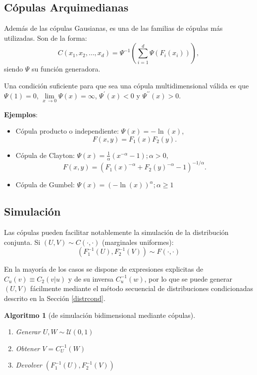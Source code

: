 \documentclass[
]{book}
\theoremstyle{break}
\newtheorem{conjecture}{Algoritmo}[chapter]
\theoremstyle{nonumberplain}
\begin{document}
\hypertarget{cuxf3pulas-arquimedianas}{%
\subsection{Cópulas Arquimedianas}\label{cuxf3pulas-arquimedianas}}

Además de las cópulas Gausianas, es una de las familias de cópulas más utilizadas.
Son de la forma:
\[C(x_1,x_2,\dots,x_d)
=\Psi^{-1}\left( \sum_{i=1}^d\Psi\left( F_i(x_i)\right)\right),\]
siendo \(\Psi\) su función generadora.

Una condición suficiente para que sea una cópula multidimensional válida es que \(\Psi(1)=0\), \(\lim \limits_{x\ \rightarrow0}\Psi(x)=\infty\), \(\Psi^{\prime}(x)<0\) y \(\Psi^{\prime \prime}(x)>0\).

\textbf{Ejemplos}:

\begin{itemize}
\item
  Cópula producto o independiente:
  \(\Psi(x)=-\ln(x)\),
  \[F(x,y)=F_1(x)F_2(y).\]
\item
  Cópula de Clayton: \(\Psi(x)=\frac{1}{\alpha}\left( x^{-\alpha }-1\right) ;\alpha>0\),
  \[F(x,y)=(F_1(x)^{-\alpha}+F_2(y)^{-\alpha}-1)^{-1/\alpha}.\]
\item
  Cópula de Gumbel:
  \(\Psi(x)=\left( -\ln(x)\right)^{\alpha};\alpha \geq1\)
\end{itemize}

\hypertarget{simulaciuxf3n}{%
\subsection{Simulación}\label{simulaciuxf3n}}

Las cópulas pueden facilitar notablemente la simulación de la distribución conjunta.
Si \((U,V)\sim C(\cdot,\cdot)\) (marginales uniformes):
\[\left( F_1^{-1}(U),F_2^{-1}(V)\right)  \sim F(\cdot,\cdot)\]

En la mayoría de los casos se dispone de expresiones explicitas de \(C_{u}(v)\equiv C_2\left( \left. v\right \vert u\right)\) y de su inversa \(C_{u}^{-1}(w)\), por lo que se puede generar \((U,V)\) fácilmente mediante el método secuencial de distribuciones condicionadas descrito en la Sección \ref{distrcond}.

\begin{conjecture}[de simulación bidimensional mediante cópulas]
\protect\hypertarget{cnj:copula-bidim}{}\label{cnj:copula-bidim}

\begin{enumerate}
\def\labelenumi{\arabic{enumi}.}
\item
  Generar \(U,W\sim \mathcal{U}(0,1)\)
\item
  Obtener \(V=C_{U}^{-1}(W)\)
\item
  Devolver \(\left( F_1^{-1}(U),F_2^{-1}(V)\right)\)
\end{enumerate}

\end{conjecture}
\end{document}
